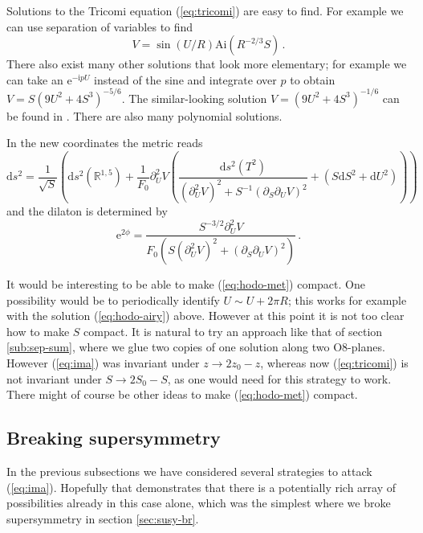 \documentclass[12pt]{article}
\newcommand{\R}{\mathbb{R}}
\newcommand{\dd}{\mathrm{d}}
\newcommand{\e}{\mathrm{e}}
\newcommand{\ii}{\mathrm{i}}
\begin{document}
Solutions to the Tricomi equation (\ref{eq:tricomi}) are easy to find. For example we can use separation of variables to find
\begin{equation}\label{eq:hodo-airy}
	 V= \sin(U/R) \mathrm{Ai}(R^{-2/3}S) \,.
\end{equation} 
There also exist many other solutions that look more elementary; for example we can take an $\e^{-\ii p U}$ instead of the sine and integrate over $p$ to obtain $V = S(9 U^2 + 4 S^3)^{-5/6}$. The similar-looking solution $V = (9 U^2 + 4 S^3)^{-1/6}$ can be found in \cite[eq. (12)]{youm}. There are also many polynomial solutions. 

In the new coordinates the metric reads
\begin{equation}\label{eq:hodo-met}
	\dd s^2 = \frac1{\sqrt S} \left(\dd s^2 (\R^{1,5})+ \frac{1}{F_0} \partial_U^2 V \left( \frac{\dd s^2(T^2)}{(\partial_U^2 V)^2 + S^{-1}(\partial_S \partial_U V)^2} + (S \dd S^2 +  \dd U^2) \right) \right) 
\end{equation}
and the dilaton is determined by
\begin{equation}
	\e^{2\phi} = \frac{S^{-3/2}\partial_U^2 V}{F_0(S(\partial_U^2 V)^2 +(\partial_S \partial_U V)^2)}\,.
\end{equation}

It would be interesting to be able to make (\ref{eq:hodo-met}) compact. One possibility would be to periodically identify $U\sim U + 2\pi R$; this works for example with the solution (\ref{eq:hodo-airy}) above. However at this point it is not too clear how to make $S$ compact. It is natural to try an approach like that of section \ref{sub:sep-sum}, where we glue two copies of one solution along two O8-planes. However (\ref{eq:ima}) was invariant under $z \to 2z_0-z$, whereas now (\ref{eq:tricomi}) is not invariant under $S\to 2 S_0 -S$, as one would need for this strategy to work. There might of course be other ideas to make (\ref{eq:hodo-met}) compact.



\subsection{Breaking supersymmetry} \label{sub:ex-br}

In the previous subsections we have considered several strategies to attack (\ref{eq:ima}). Hopefully that demonstrates that there is a potentially rich array of possibilities already in this case alone, which was the simplest where we broke supersymmetry in section \ref{sec:susy-br}. 
\end{document}
